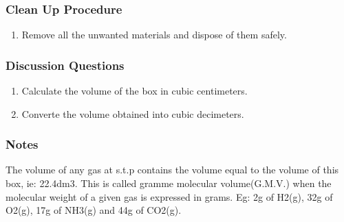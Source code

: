 \subsubsection*{Clean Up Procedure}
\begin{enumerate}
\item{Remove all the unwanted materials and dispose of them safely.}
\end{enumerate}

\subsubsection*{Discussion Questions}
\begin{enumerate}
\item{Calculate the volume of the box in cubic centimeters.}
\item{Converte the volume obtained into cubic decimeters.}
\end{enumerate}

\subsubsection*{Notes}
The volume of any gas at s.t.p contains the volume equal to the volume of this box, ie: 22.4dm3. This is called gramme molecular volume(G.M.V.) when the molecular weight of a given gas is expressed in grams. Eg: 2g of H2(g), 32g of O2(g), 17g of NH3(g) and 44g of CO2(g).
